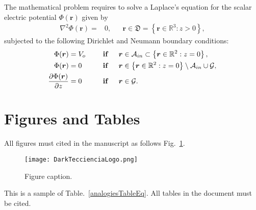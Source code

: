 \documentclass[10pt]{article}
\begin{document}
The mathematical problem requires to solve a Laplace's equation for the scalar electric potential $\Phi(\boldsymbol{r})$ given by
\begin{align}
    \nabla^2 \Phi(\boldsymbol{r}) =& 0, &&\boldsymbol{r} \in \mathfrak{D}=\left\{\boldsymbol{r} \in \mathbb{R}^3 : z > 0 \right\}, \label{LaplaceElectrostaticEquation}
\end{align}{}
subjected to the following Dirichlet and Neumann boundary conditions:
\begin{align}
\Phi(\boldsymbol{r}) &= V_o  \hspace{0.5cm} &&\mbox{\textbf{if}} \hspace{0.5cm} \boldsymbol{r} \in \mathcal{A}_{in} \subset \left\{\boldsymbol{r} \in \mathbb{R}^2 : z = 0 \right\},\label{DirichletBoundaryConditionsEq1}\\
\Phi(\boldsymbol{r}) &= 0 \hspace{0.5cm} &&\mbox{\textbf{if}} \hspace{0.5cm} \boldsymbol{r} \in \left\{\boldsymbol{r} \in \mathbb{R}^2 : z = 0 \right\}\setminus\mathcal{A}_{in}\cup\mathcal{G},
\label{DirichletBoundaryConditionsEq2}\\
\frac{\partial \Phi(\boldsymbol{r})}{\partial z} &=0 &&\mbox{\textbf{if}} \hspace{0.5cm} \boldsymbol{r} \in \mathcal{G}.
\label{NeumannBoundaryConditionsEq}
\end{align}

\section{Figures and Tables}
All figures must cited in the manuscript as follows Fig.~\ref{theSystemFig}.


\begin{figure}[H]
\centering %
\texttt{[image: DarkTeccienciaLogo.png]}
    \caption[The system.]{Figure caption. }
\label{theSystemFig}
\end{figure} 

This is a sample of Table.~\ref{analogiesTableEq}. All tables in the document must be cited.
\end{document}
